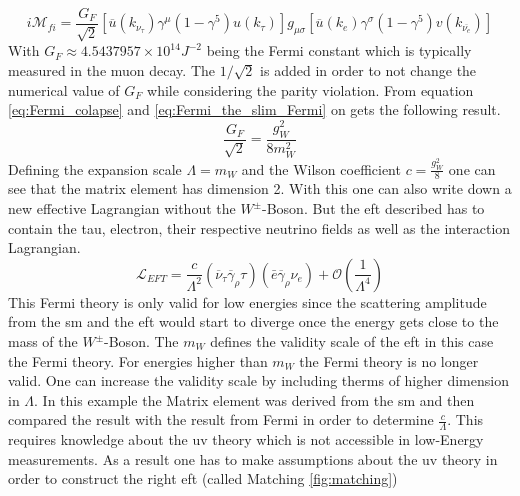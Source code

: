 \documentclass[../Bachelorarbeit.tex]{subfiles}
\begin{document}
\begin{equation}
    i\mathcal{M}_{fi} = \frac{G_{F}}{\sqrt{2}} \left[ \overline{u}(k_{\nu_{\tau}})\gamma^{\mu}(1-\gamma^{5})u(k_{\tau}) \right] g_{\mu\sigma} \left[ \overline{u}(k_{e})\gamma^{\sigma}(1-\gamma^{5})v(k_{\overline{\nu_{e}}}) \right]
    \label{eq:Fermi_the_slim_Fermi}
\end{equation}
With $G_{F} \approx 4.5437957\times 10^{14} J^{-2}$ being the Fermi constant which is typically measured in the muon decay. The $1/\sqrt{2}$ is added in order to not change the numerical value of $G_{F}$ while considering the parity violation.
From equation \ref{eq:Fermi_colapse} and \ref{eq:Fermi_the_slim_Fermi} on gets the following result.
\begin{equation}
    \frac{G_{F}}{\sqrt{2}} = \frac{g_{W}^{2}}{8 m_{W}^{2}}
\end{equation}
Defining the expansion scale $\Lambda=m_{W}$ and the Wilson coefficient $c= \frac{g_{W}^{2}}{8}$ one can see that the matrix element has dimension 2.
With this one can also write down a new effective Lagrangian without the $W^{\pm }$-Boson. But the \acrshort{eft} described has to contain the tau, electron, their respective neutrino fields
as well as the interaction Lagrangian.
\begin{equation}
    \mathcal{L}_{EFT} = \frac{c}{\Lambda^{2}} \left( \overline{\nu}_{\tau} \overline{\gamma}_{\rho} \tau \right) \left(\bar{e} \overline{\gamma}_{\rho} \nu_{e} \right) + \mathcal{O}(\frac{1}{\Lambda^{4}})
\end{equation}
This Fermi theory is only valid for low energies since the scattering amplitude from the \acrshort{sm} and the \acrshort{eft} would
start to diverge once the energy gets close to the mass of the $W^{\pm}$-Boson.
The $m_{W}$ defines the validity scale of the \acrshort{eft} in this case the Fermi theory. For energies higher than $m_{W}$ the
Fermi theory is no longer valid. One can increase the validity scale by including therms of higher dimension in $\Lambda$.
In this example the Matrix element was derived from the \acrshort{sm} and then compared the result with the result from Fermi in
order to determine $\frac{c}{\Lambda}$. This requires knowledge about the \acrshort{uv} theory which is not accessible in low-Energy
measurements. As a result one has to make assumptions about the \acrshort{uv} theory in order to construct the right \acrshort{eft} (called Matching \ref{fig:matching})
\end{document}
